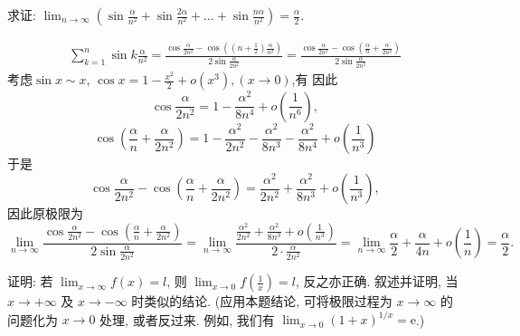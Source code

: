 \begin{exercise}[1.3.7]
    求证: $\lim_{n \to \infty} \left(\sin\frac{\alpha}{n^2} + \sin\frac{2\alpha}{n^2} + \dots + \sin\frac{n\alpha}{n^2}\right) = \frac{\alpha}{2}$.
\end{exercise}

\begin{solution}
    \begin{align*}
        \sum_{k=1}^n \sin k \frac{\alpha}{n^2} = \frac{\cos \frac{\alpha}{2n^2} -\cos \left( (n+\frac{1}{2})\frac{\alpha}{n^2} \right) }{2 \sin \frac{\alpha}{2n^2}} = \frac{\cos \frac{\alpha}{2n^2} - \cos \left( \frac{\alpha}n + \frac{\alpha}{2n^2} \right)}{2 \sin \frac{\alpha}{2n^2}}
    \end{align*}
    考虑$\sin x \sim x$, $\cos x = 1 - \frac{x^2}{2} + o(x^3), (x \to 0)$,有
    因此
    $$\cos \frac{\alpha}{2n^2} = 1 - \frac{\alpha^2}{8n^4} + o\left( \frac{1}{n^6} \right),$$
    $$\cos \left( \frac{\alpha}n + \frac{\alpha}{2n^2} \right) = 1 - \frac{\alpha^2}{2n^2} - \frac{\alpha^2}{8n^3} - \frac{\alpha^2}{8n^4} + o\left( \frac{1}{n^3} \right) $$
    于是
    $$\cos \frac{\alpha}{2n^2} - \cos \left( \frac{\alpha}n + \frac{\alpha}{2n^2} \right) = \frac{\alpha^2}{2n^2} + \frac{\alpha^2}{8n^3} + o\left( \frac{1}{n^3} \right),$$
    因此原极限为
    $$\lim_{n \to \infty} \frac{\cos \frac{\alpha}{2n^2} - \cos \left( \frac{\alpha}n + \frac{\alpha}{2n^2} \right)}{2 \sin \frac{\alpha}{2n^2}} = \lim_{n \to \infty} \frac{\frac{\alpha^2}{2n^2} + \frac{\alpha^2}{8n^3} + o\left( \frac{1}{n^3} \right)}{2 \cdot \frac{\alpha}{2n^2}} = \lim_{n \to \infty} \frac{\alpha}{2} + \frac{\alpha}{4n} + o\left( \frac{1}{n} \right) = \frac{\alpha}{2}.$$

\end{solution}

\begin{exercise}[1.3.8]
    证明: 若 $\lim_{x \to \infty} f(x) = l$, 则 $\lim_{x \to 0} f\left(\frac{1}{x}\right)=l$, 反之亦正确. 叙述并证明, 当 $x \to +\infty$ 及 $x \to -\infty$ 时类似的结论. (应用本题结论, 可将极限过程为 $x \to \infty$ 的问题化为 $x \to 0$ 处理, 或者反过来. 例如, 我们有 $\lim_{x \to 0} (1+x)^{1/x} = \mathrm{e}$.)
\end{exercise}

